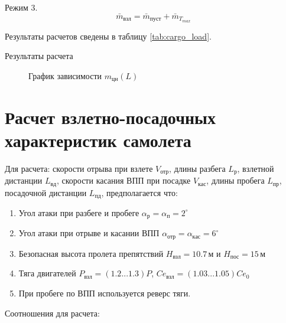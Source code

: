 Режим 3.
\[
    \bar{m}_{взл} = \bar{m}_{пуст} + \bar{m}_{T_{max}}
\]

Результаты расчетов сведены в таблицу \ref{tab:cargo_load}.

\begin{table}[H]
    \centering
    \caption{Результаты расчета}
    \label{tab:cargo_load}
    
\end{table}

\begin{figure}[H]
\centering
\resizebox{.79\linewidth}{!}{}
\caption{График зависимости $m_{цн}(L)$}
\label{fig:m_L}
\end{figure}



\section{Расчет взлетно-посадочных характеристик самолета}
Для расчета: скорости отрыва при взлете $V_{отр}$, длины разбега
$L_{р}$, взлетной дистанции $L_{вд}$, скорости касания ВПП при посадке
$V_{кас}$, длины пробега $L_{пр}$, посадочной дистанции $L_{пд}$, предполагается что:
\begin{enumerate}
    \item Угол атаки при разбеге и пробеге $\alpha_р = \alpha_{п} = 2^\circ$ 
    \item Угол атаки при отрыве и касании ВПП $\alpha_{отр} = \alpha_{кас} = 6^\circ$
    \item Безопасная высота пролета препятствий $H_{взл} = 10.7\, м$ и $H_{пос} = 15\, м$
    \item Тяга двигателей $P_{взл} = (1.2 ... 1.3)P$, $Ce_{взл} = (1.03 ... 1.05) Ce_0$ 
    \item При пробеге по ВПП используется реверс тяги.
\end{enumerate}

Соотношения для расчета:

